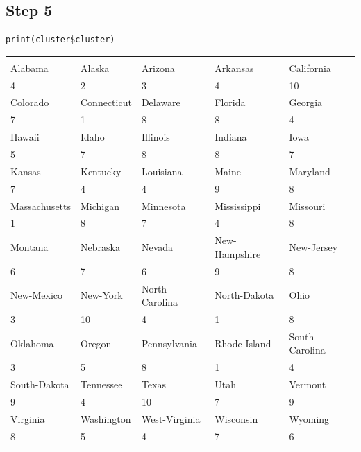 \documentclass[11pt]{article}
\begin{document}
\subsection*{Step 5}
\label{sec:org376b662}
\begin{verbatim}
print(cluster$cluster)
\end{verbatim}
\begin{center}
\begin{tabular}{lllll}
 &  &  &  & \\
Alabama & Alaska & Arizona & Arkansas & California\\
4 & 2 & 3 & 4 & 10\\
Colorado & Connecticut & Delaware & Florida & Georgia\\
7 & 1 & 8 & 8 & 4\\
Hawaii & Idaho & Illinois & Indiana & Iowa\\
5 & 7 & 8 & 8 & 7\\
Kansas & Kentucky & Louisiana & Maine & Maryland\\
7 & 4 & 4 & 9 & 8\\
Massachusetts & Michigan & Minnesota & Mississippi & Missouri\\
1 & 8 & 7 & 4 & 8\\
Montana & Nebraska & Nevada & New-Hampshire & New-Jersey\\
6 & 7 & 6 & 9 & 8\\
New-Mexico & New-York & North-Carolina & North-Dakota & Ohio\\
3 & 10 & 4 & 1 & 8\\
Oklahoma & Oregon & Pennsylvania & Rhode-Island & South-Carolina\\
3 & 5 & 8 & 1 & 4\\
South-Dakota & Tennessee & Texas & Utah & Vermont\\
9 & 4 & 10 & 7 & 9\\
Virginia & Washington & West-Virginia & Wisconsin & Wyoming\\
8 & 5 & 4 & 7 & 6\\
\end{tabular}
\end{center}
\end{document}
